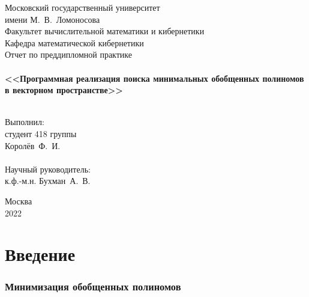 \documentclass[a4paper,12pt,titlepage,finall]{article}
\begin{document}
\begin{titlepage}
    \begin{center}
    {\small \sc Московский государственный университет \\имени М.~В.~Ломоносова\\
    Факультет вычислительной математики и кибернетики\\Кафедра математической кибернетики\\}
    \vfill
    {\Large \sc Отчет по преддипломной практике}\\
    ~\\
    {\large \bf <<Программная реализация поиска минимальных обобщенных полиномов в векторном пространстве>>}\\
    ~\\
    \end{center}
    \begin{flushright}
    \vfill {Выполнил:\\
    студент 418 группы\\
    Королёв~Ф.~И.\\
    ~\\
    Научный руководитель:\\
    к.ф.-м.н. Бухман~А.~В.}
    \end{flushright}
    \begin{center}
    \vfill
    {\small Москва\\2022}
    \end{center}
\end{titlepage}

\tableofcontents
\newpage


\section{Введение}


\subsubsection*{Минимизация обобщенных полиномов}
\end{document}
